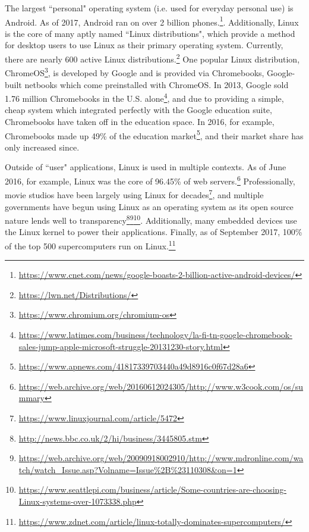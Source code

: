 \documentclass[11pt]{article}
\begin{document}
The largest ``personal" operating system (i.e. used for everyday personal use) is Android.  As of 2017, Android ran on over 2 billion phones.\footnote{\url{https://www.cnet.com/news/google-boasts-2-billion-active-android-devices/}}.  Additionally, Linux is the core of many aptly named ``Linux distributions", which provide a method for desktop users to use Linux as their primary operating system.  Currently, there are nearly 600 active Linux distributions.\footnote{\url{https://lwn.net/Distributions/}}  One popular Linux distribution, ChromeOS\footnote{\url{https://www.chromium.org/chromium-os}}, is developed by Google and is provided via Chromebooks, Google-built netbooks which come preinstalled with ChromeOS.  In 2013, Google sold 1.76 million Chromebooks in the U.S. alone\footnote{\url{https://www.latimes.com/business/technology/la-fi-tn-google-chromebook-sales-jump-apple-microsoft-struggle-20131230-story.html}}, and due to providing a simple, cheap system which integrated perfectly with the Google education suite, Chromebooks have taken off in the education space.  In 2016, for example, Chromebooks made up 49\% of the education market\footnote{\url{https://www.apnews.com/41817339703440a49d8916c0f67d28a6}}, and their market share has only increased since.

Outside of ``user" applications, Linux is used in multiple contexts.  As of June 2016, for example, Linux was the core of 96.45\% of web servers.\footnote{\url{https://web.archive.org/web/20160612024305/http://www.w3cook.com/os/summary}}  Professionally, movie studios have been largely using Linux for decades\footnote{\url{https://www.linuxjournal.com/article/5472}}, and multiple governments have begun using Linux as an operating system as its open source nature lends well to transparency\footnote{\url{http://news.bbc.co.uk/2/hi/business/3445805.stm}}\footnote{\url{https://web.archive.org/web/20090918002910/http://www.mdronline.com/watch/watch_Issue.asp?Volname=Issue\%2B\%23110308&on=1}}\footnote{\url{https://www.seattlepi.com/business/article/Some-countries-are-choosing-Linux-systems-over-1073338.php}}.  Additionally, many embedded devices use the Linux kernel to power their applications.  Finally, as of September 2017, 100\% of the top 500 supercomputers run on Linux.\footnote{\url{https://www.zdnet.com/article/linux-totally-dominates-supercomputers/}}
\end{document}
